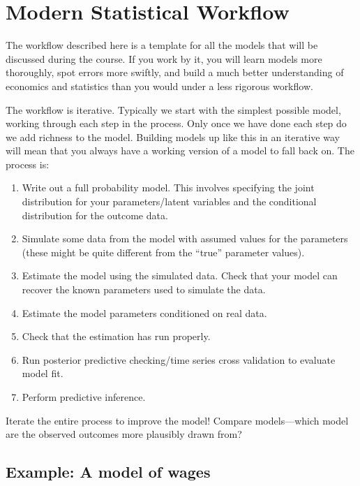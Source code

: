 \documentclass[]{book}
\providecommand{\tightlist}{%
  \setlength{\itemsep}{0pt}\setlength{\parskip}{0pt}}
\begin{document}
\section{Modern Statistical Workflow}\label{modern-statistical-workflow}

The workflow described here is a template for all the models that will
be discussed during the course. If you work by it, you will learn models
more thoroughly, spot errors more swiftly, and build a much better
understanding of economics and statistics than you would under a less
rigorous workflow.

The workflow is iterative. Typically we start with the simplest possible
model, working through each step in the process. Only once we have done
each step do we add richness to the model. Building models up like this
in an iterative way will mean that you always have a working version of
a model to fall back on. The process is:

\begin{enumerate}
\def\labelenumi{\arabic{enumi}.}
\tightlist
\item
  Write out a full probability model. This involves specifying the joint
  distribution for your parameters/latent variables and the conditional
  distribution for the outcome data.
\item
  Simulate some data from the model with assumed values for the
  parameters (these might be quite different from the ``true'' parameter
  values).
\item
  Estimate the model using the simulated data. Check that your model can
  recover the known parameters used to simulate the data.
\item
  Estimate the model parameters conditioned on real data.
\item
  Check that the estimation has run properly.
\item
  Run posterior predictive checking/time series cross validation to
  evaluate model fit.
\item
  Perform predictive inference.
\end{enumerate}

Iterate the entire process to improve the model! Compare models---which
model are the observed outcomes more plausibly drawn from?

\subsection{Example: A model of wages}\label{example-a-model-of-wages}
\end{document}
